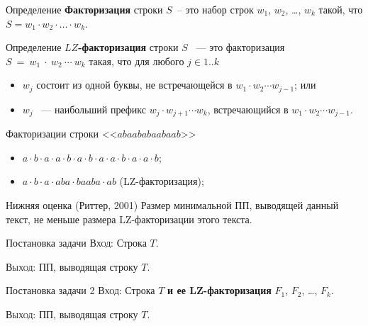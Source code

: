 ﻿\documentclass[10pt,pdf,hyperref={unicode}]{beamer}
\begin{document}
\begin{frame}
\begin{block}{Определение}
\textbf{Факторизация} строки $S$~-- это набор строк $w_1$, $w_2$, \ldots, $w_k$ такой,
что $S = w_1 \cdot w_2 \cdot \ldots \cdot w_k$.
\end{block}
\pause
\begin{block}{Определение}
\textbf{$LZ$-факторизация} строки $S$ ~--- это факторизация $S~=~w_1~\cdot~w_2~\cdots~w_k$ такая, что
для любого $j \in 1..k$
\begin{itemize}
	\item $w_j$ состоит из одной буквы, не встречающейся в $w_1 \cdot w_2 \cdots w_{j-1}$; или
	\item $w_j$ ~--- наибольший префикс $w_j \cdot w_{j+1} \cdots w_k$, встречающийся в $w_1 \cdot w_2 \cdots w_{j-1}$.
\end{itemize}
\end{block}

\begin{exampleblock}{Факторизации строки <<$abaababaabaab$>>}
\begin{itemize}
  \item $a \cdot b \cdot a \cdot a \cdot b \cdot a \cdot b \cdot a \cdot a
  \cdot b \cdot a \cdot a \cdot b$;
  \item $a \cdot b \cdot a \cdot aba \cdot baaba \cdot ab$ (LZ-факторизация);
\end{itemize}
\end{exampleblock}
\end{frame}

\begin{frame}
\begin{block}{Нижняя оценка (Риттер, 2001)}
	Размер минимальной ПП, выводящей данный текст, не меньше размера LZ-факторизации этого текста.
\end{block}

\pause

\begin{block}{Постановка задачи}
\textsc{Вход:} Строка $T$.

\textsc{Выход:} ПП, выводящая строку $T$.
\end{block}

\pause

\begin{block}{Постановка задачи 2}
\textsc{Вход:} Строка $T$ {\bf и ее LZ-факторизация} $F_1$, $F_2$, \ldots, $F_k$.

\textsc{Выход:} ПП, выводящая строку $T$.
\end{block}

\end{frame}
\end{document}
